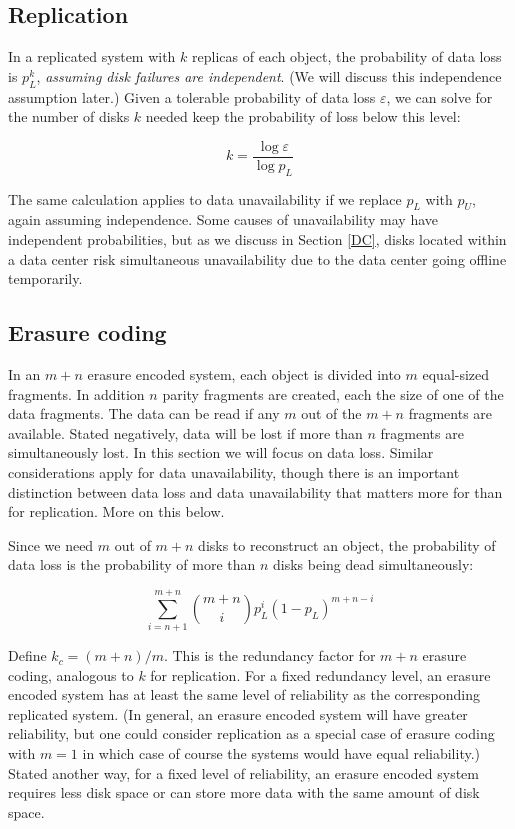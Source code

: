 \documentclass[11pt]{article}
\begin{document}
\subsection{Replication}

In a replicated system with $k$ replicas of each object, the probability of data loss is $p_L^k$, \emph{assuming disk failures are independent}. (We will discuss this independence assumption later.) Given a tolerable probability of data loss $\varepsilon$, we can solve for the number of disks $k$ needed keep the probability of loss below this level:

\begin{equation}
 k = \frac{\log \varepsilon}{\log p_L} \label{kreplication}
\end{equation}

The same calculation applies to data unavailability if we replace $p_L$ with $p_U$, again assuming independence. Some causes of unavailability may have independent probabilities, but as we discuss in Section \ref{DC}, disks located within a data center risk simultaneous unavailability due to the data center going offline temporarily.

\subsection{Erasure coding}

In an $m+n$ erasure encoded system, each object is divided into $m$ equal-sized fragments. In addition $n$ parity fragments are created, each the size of one of the data fragments. The data can be read if any $m$ out of the $m+n$ fragments are available. Stated negatively, data will be lost if more than $n$ fragments are simultaneously lost. In this section we will focus on data loss. Similar considerations apply for data unavailability, though there is an important distinction between data loss and data unavailability that matters more for than for replication. More on this below.

Since we need $m$ out of $m+n$ disks to reconstruct an object, the probability of data loss is the probability of more than $n$ disks being dead simultaneously:

\begin{equation}
\sum_{i=n+1}^{m+n} {m+n \choose i} p_L^i (1-p_L)^{m+n-i} \label{ecfailure1}
\end{equation}

Define $k_c = (m+n)/m$. This is the redundancy factor for $m+n$ erasure coding, analogous to $k$ for replication. For a fixed redundancy level, an erasure encoded system has at least the same level of reliability as the corresponding replicated system. (In general, an erasure encoded system will have greater reliability, but one could consider replication as a special case of erasure coding with $m = 1$ in which case of course the systems would have equal reliability.) Stated another way, for a fixed level of reliability, an erasure encoded system requires less disk space or can store more data with the same amount of disk space.
\end{document}
